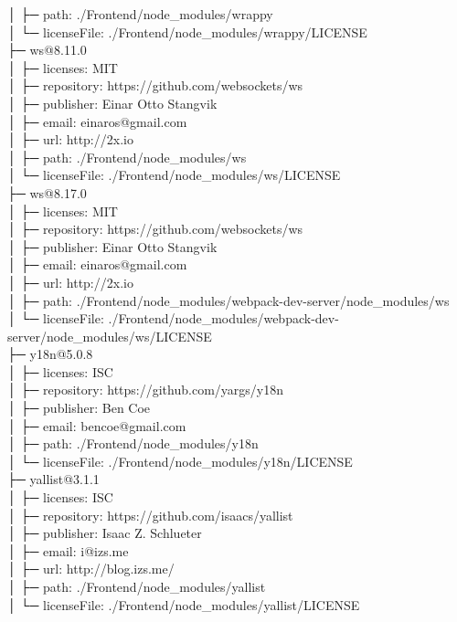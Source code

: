 │  ├─ path: ./Frontend/node\_modules/wrappy\\
│  └─ licenseFile: ./Frontend/node\_modules/wrappy/LICENSE\\
├─ ws@8.11.0\\
│  ├─ licenses: MIT\\
│  ├─ repository: https://github.com/websockets/ws\\
│  ├─ publisher: Einar Otto Stangvik\\
│  ├─ email: einaros@gmail.com\\
│  ├─ url: http://2x.io\\
│  ├─ path: ./Frontend/node\_modules/ws\\
│  └─ licenseFile: ./Frontend/node\_modules/ws/LICENSE\\
├─ ws@8.17.0\\
│  ├─ licenses: MIT\\
│  ├─ repository: https://github.com/websockets/ws\\
│  ├─ publisher: Einar Otto Stangvik\\
│  ├─ email: einaros@gmail.com\\
│  ├─ url: http://2x.io\\
│  ├─ path: ./Frontend/node\_modules/webpack-dev-server/node\_modules/ws\\
│  └─ licenseFile: ./Frontend/node\_modules/webpack-dev-server/node\_modules/ws/LICENSE\\
├─ y18n@5.0.8\\
│  ├─ licenses: ISC\\
│  ├─ repository: https://github.com/yargs/y18n\\
│  ├─ publisher: Ben Coe\\
│  ├─ email: bencoe@gmail.com\\
│  ├─ path: ./Frontend/node\_modules/y18n\\
│  └─ licenseFile: ./Frontend/node\_modules/y18n/LICENSE\\
├─ yallist@3.1.1\\
│  ├─ licenses: ISC\\
│  ├─ repository: https://github.com/isaacs/yallist\\
│  ├─ publisher: Isaac Z. Schlueter\\
│  ├─ email: i@izs.me\\
│  ├─ url: http://blog.izs.me/\\
│  ├─ path: ./Frontend/node\_modules/yallist\\
│  └─ licenseFile: ./Frontend/node\_modules/yallist/LICENSE\\
